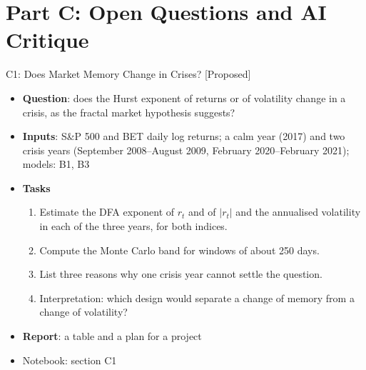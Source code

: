\section{Part C: Open Questions and AI Critique}

\begin{frame}{C1: Does Market Memory Change in Crises? [Proposed]}
\itemsize{\footnotesize}
\begin{itemize}
\item \textbf{Question}: does the Hurst exponent of returns or of volatility change in a crisis, as the fractal market hypothesis suggests?
\item \textbf{Inputs}: S\&P 500 and BET daily log returns; a calm year (2017) and two crisis years (September 2008--August 2009, February 2020--February 2021); models: B1, B3
\item \textbf{Tasks}
\begin{enumerate}
    \item Estimate the DFA exponent of $r_t$ and of $|r_t|$ and the annualised volatility in each of the three years, for both indices.
    \item Compute the Monte Carlo band for windows of about 250 days.
    \item List three reasons why one crisis year cannot settle the question.
    \item Interpretation: which design would separate a change of memory from a change of volatility?
\end{enumerate}
\item \textbf{Report}: a table and a plan for a project
\item Notebook: section C1
\end{itemize}
\end{frame}

